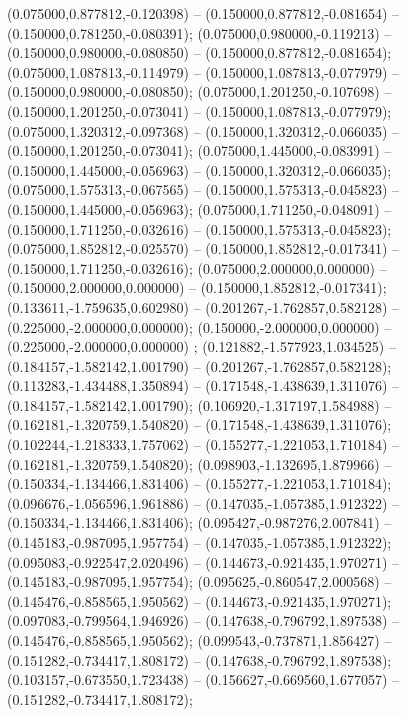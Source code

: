  (0.075000,0.877812,-0.120398) -- (0.150000,0.877812,-0.081654) -- (0.150000,0.781250,-0.080391);
 (0.075000,0.980000,-0.119213) -- (0.150000,0.980000,-0.080850) -- (0.150000,0.877812,-0.081654);
 (0.075000,1.087813,-0.114979) -- (0.150000,1.087813,-0.077979) -- (0.150000,0.980000,-0.080850);
 (0.075000,1.201250,-0.107698) -- (0.150000,1.201250,-0.073041) -- (0.150000,1.087813,-0.077979);
 (0.075000,1.320312,-0.097368) -- (0.150000,1.320312,-0.066035) -- (0.150000,1.201250,-0.073041);
 (0.075000,1.445000,-0.083991) -- (0.150000,1.445000,-0.056963) -- (0.150000,1.320312,-0.066035);
 (0.075000,1.575313,-0.067565) -- (0.150000,1.575313,-0.045823) -- (0.150000,1.445000,-0.056963);
 (0.075000,1.711250,-0.048091) -- (0.150000,1.711250,-0.032616) -- (0.150000,1.575313,-0.045823);
 (0.075000,1.852812,-0.025570) -- (0.150000,1.852812,-0.017341) -- (0.150000,1.711250,-0.032616);
 (0.075000,2.000000,0.000000) -- (0.150000,2.000000,0.000000) -- (0.150000,1.852812,-0.017341);
 (0.133611,-1.759635,0.602980) -- (0.201267,-1.762857,0.582128) -- (0.225000,-2.000000,0.000000);
 (0.150000,-2.000000,0.000000) -- (0.225000,-2.000000,0.000000) ;
 (0.121882,-1.577923,1.034525) -- (0.184157,-1.582142,1.001790) -- (0.201267,-1.762857,0.582128);
 (0.113283,-1.434488,1.350894) -- (0.171548,-1.438639,1.311076) -- (0.184157,-1.582142,1.001790);
 (0.106920,-1.317197,1.584988) -- (0.162181,-1.320759,1.540820) -- (0.171548,-1.438639,1.311076);
 (0.102244,-1.218333,1.757062) -- (0.155277,-1.221053,1.710184) -- (0.162181,-1.320759,1.540820);
 (0.098903,-1.132695,1.879966) -- (0.150334,-1.134466,1.831406) -- (0.155277,-1.221053,1.710184);
 (0.096676,-1.056596,1.961886) -- (0.147035,-1.057385,1.912322) -- (0.150334,-1.134466,1.831406);
 (0.095427,-0.987276,2.007841) -- (0.145183,-0.987095,1.957754) -- (0.147035,-1.057385,1.912322);
 (0.095083,-0.922547,2.020496) -- (0.144673,-0.921435,1.970271) -- (0.145183,-0.987095,1.957754);
 (0.095625,-0.860547,2.000568) -- (0.145476,-0.858565,1.950562) -- (0.144673,-0.921435,1.970271);
 (0.097083,-0.799564,1.946926) -- (0.147638,-0.796792,1.897538) -- (0.145476,-0.858565,1.950562);
 (0.099543,-0.737871,1.856427) -- (0.151282,-0.734417,1.808172) -- (0.147638,-0.796792,1.897538);
 (0.103157,-0.673550,1.723438) -- (0.156627,-0.669560,1.677057) -- (0.151282,-0.734417,1.808172);
